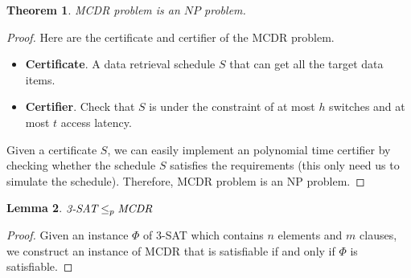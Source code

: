 \documentclass[12pt,a4paper]{article}
\newtheorem{theorem}{Theorem}
\newtheorem{lemma}[theorem]{Lemma}
\theoremstyle{definition}
\begin{document}
\begin{enumerate}
    \begin{theorem}\label{MCDR-NP}
        \emph{MCDR} problem is an $NP$ problem.
    \end{theorem}
    \begin{proof}
    Here are the certificate and certifier of the MCDR problem.
    \begin{itemize}
    \item \textbf{Certificate}. A data retrieval schedule $S$ that can get all the target data items.
    \item \textbf{Certifier}. Check that $S$ is under the constraint of at most $h$ switches and at most $t$ access latency.
    \end{itemize}
    Given a certificate $S$, we can easily implement an polynomial time certifier by checking whether the schedule $S$ satisfies the requirements (this only need us to simulate the schedule). Therefore, MCDR problem is an NP problem.
    \end{proof}
    
    \begin{lemma}\label{3-SAT-REDUCE-MCDR}
        $\emph{3-SAT} \leq_p \emph{MCDR}$
    \end{lemma}
    \begin{proof}
    Given an instance $\Phi$ of 3-SAT which contains $n$ elements and $m$ clauses, we construct an instance of MCDR that is satisfiable if and only if $\Phi$ is satisfiable.
    

\end{proof}
\end{enumerate}
\end{document}
